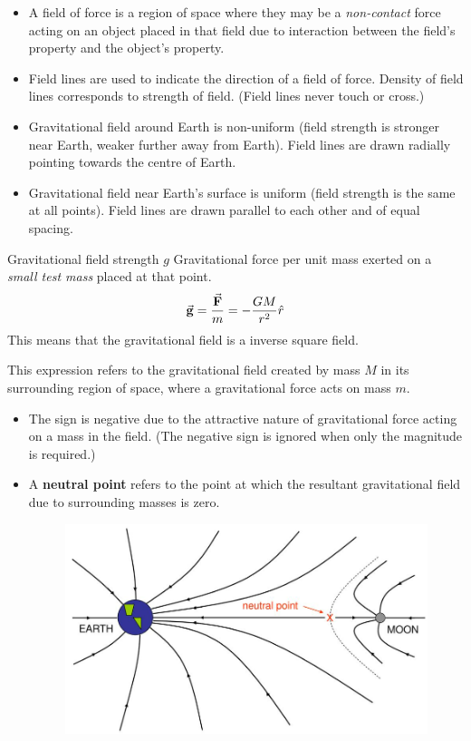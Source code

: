 \begin{itemize}
    \item A field of force is a region of space where they may be a \emph{non-contact} force acting on an object placed in that field due to interaction between the field's property and the object's property.
    \item Field lines are used to indicate the direction of a field of force. Density of field lines corresponds to strength of field. (Field lines never touch or cross.)
    \item Gravitational field around Earth is non-uniform (field strength is stronger near Earth, weaker further away from Earth). Field lines are drawn radially pointing towards the centre of Earth.
    \item Gravitational field near Earth's surface is uniform (field strength is the same at all points). Field lines are drawn parallel to each other and of equal spacing.
\end{itemize}

\begin{defn}{Gravitational field strength $g$}{}
Gravitational force per unit mass exerted on a \emph{small test mass} placed at that point.
\begin{equation}
\va{g} = \frac{\va{F}}{m} = -\frac{GM}{r^2}\hat{r} 
\end{equation}
This means that the gravitational field is a inverse square field.
\end{defn} 


This expression refers to the gravitational field created by mass $M$ in its surrounding region of space, where a gravitational force acts on mass $m$.

\begin{itemize}
\item The sign is negative due to the attractive nature of gravitational force acting on a mass in the field. (The negative sign is ignored when only the magnitude is required.)
\item A \textbf{neutral point} refers to the point at which the resultant gravitational field due to surrounding masses is zero.
\begin{figure}[H]
    \centering
    \includegraphics[width=12cm]{images/Neutral_point.png}
    \end{figure}
\end{itemize}

